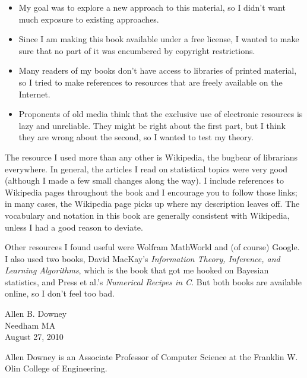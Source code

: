 \documentclass[12pt]{book}
\begin{document}
\begin{itemize}

\item My goal was to explore a new approach to this material, so I didn't
want much exposure to existing approaches.

\item Since I am making this book available under a free license, I wanted
to make sure that no part of it was encumbered by copyright restrictions.

\item Many readers of my books don't have access to libraries of
printed material, so I tried to make references to resources that are
freely available on the Internet.

\item Proponents of old media think that the exclusive
use of electronic resources is lazy and unreliable.  They might be right
about the first part, but I think they are wrong about the second, so
I wanted to test my theory.


\end{itemize}

The resource I used more than any other is Wikipedia, the bugbear
of librarians everywhere.  In general, the articles I read on
statistical topics were very good (although I made a few small changes
along the way).  I include references to Wikipedia pages throughout
the book and I encourage you to follow those links; in many cases, the
Wikipedia page picks up where my description leaves off.  The
vocabulary and notation in this book are generally consistent with
Wikipedia, unless I had a good reason to deviate.

Other resources I found useful were Wolfram MathWorld and (of course)
Google.  I also used two books, David MacKay's {\em Information
  Theory, Inference, and Learning Algorithms}, which is the book that
got me hooked on Bayesian statistics, and Press et al.'s {\em
  Numerical Recipes in C}.  But both books are available online,
so I don't feel too bad.

Allen B. Downey \\
Needham MA\\
August 27, 2010

Allen Downey is an Associate Professor of Computer Science at 
the Franklin W. Olin College of Engineering.
\end{document}
